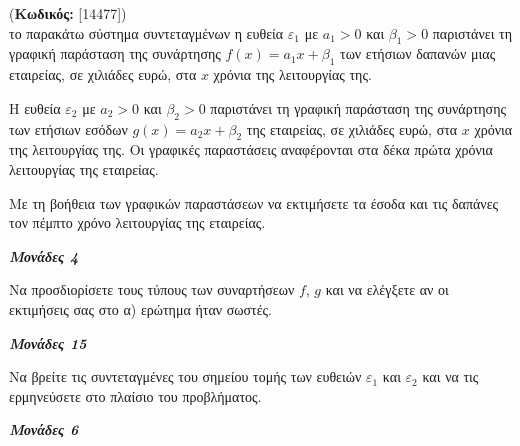 \documentclass[11pt,a4paper,twoside]{book}
\newcounter{askhsh}[chapter]
\renewcommand{\theaskhsh}{
	\bf{\titlefont{\Large{\thechapter}}.\arabic{askhsh}}
}
\newcommand{\Askhsh}[2]{\refstepcounter{askhsh}{\titlefont{Άσκηση\theaskhsh} - \textcolor{maincolor}{ΘΕΜΑ #2}} (\small{\textbf{Κωδικός:} #1})\\}{}
\newcommand{\monades}[1]{
\hspace*{\fill}
\textbf{\textit{\textcolor{maincolor}{Μονάδες #1}}}}
\begin{document}
\vspace{4mm}

\Askhsh{[14477]}
Στο παρακάτω σύστημα συντεταγμένων η ευθεία $\varepsilon_1$ με $a_1 > 0$ και $\beta_1 > 0$ παριστάνει τη γραφική παράσταση της συνάρτησης $f(x) = a_1 x + \beta_1$ των ετήσιων δαπανών μιας εταιρείας, σε χιλιάδες ευρώ, στα $x$ χρόνια της λειτουργίας της.

Η ευθεία $\varepsilon_2$ με $a_2 > 0$ και $\beta_2 > 0$ παριστάνει τη γραφική παράσταση της συνάρτησης των ετήσιων εσόδων $g(x) = a_2 x + \beta_2$ της εταιρείας, σε χιλιάδες ευρώ, στα $x$ χρόνια της λειτουργίας της. Οι γραφικές παραστάσεις αναφέρονται στα δέκα πρώτα χρόνια λειτουργίας της εταιρείας.

\begin{marginfigure}

\end{marginfigure}

\begin{alist}
\item Με τη βοήθεια των γραφικών παραστάσεων να εκτιμήσετε τα έσοδα και τις δαπάνες τον πέμπτο χρόνο λειτουργίας της εταιρείας.

\monades{4}
\item
\begin{rlist}
\item Να προσδιορίσετε τους τύπους των συναρτήσεων $f$, $g$ και να ελέγξετε αν οι εκτιμήσεις σας στο α) ερώτημα ήταν σωστές.

\monades{15}
\item Να βρείτε τις συντεταγμένες του σημείου τομής των ευθειών $\varepsilon_1$ και $\varepsilon_2$ και να τις ερμηνεύσετε στο πλαίσιο του προβλήματος.

\monades{6}
\end{rlist}
\end{alist}
\end{document}
